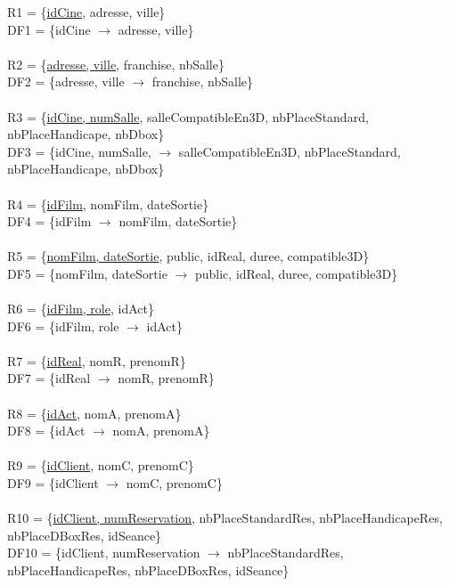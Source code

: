 \documentclass[a4paper,sffamily,12pt]{article}
\begin{document}
					\noindent R1 = \{\underline{idCine}, adresse, ville\} \\  DF1 = \{idCine $\rightarrow$ adresse, ville\} \\
					\\
					R2 = \{\underline{adresse, ville}, franchise, nbSalle\} \\ DF2 = \{adresse, ville $\rightarrow$ franchise, nbSalle\} \\
					\\
					R3 = \{\underline{idCine, numSalle}, salleCompatibleEn3D, nbPlaceStandard, nbPlaceHandicape, nbDbox\} \\ DF3 = \{idCine, numSalle, $\rightarrow$ salleCompatibleEn3D, nbPlaceStandard, nbPlaceHandicape, nbDbox\} \\
					\\
					R4 = \{\underline{idFilm}, nomFilm, dateSortie\} \\ DF4 = \{idFilm $\rightarrow$ nomFilm, dateSortie\} \\
					\\
					R5 = \{\underline{nomFilm, dateSortie}, public, idReal, duree, compatible3D\} \\ DF5 = \{nomFilm, dateSortie $\rightarrow$ public, idReal, duree, compatible3D\} \\	
					\\							
					R6 = \{\underline{idFilm, role}, idAct\} \\ DF6 = \{idFilm, role $\rightarrow$  idAct\} \\
					\\
					R7 = \{\underline{idReal}, nomR, prenomR\} \\ DF7 = \{idReal $\rightarrow$ nomR, prenomR\} \\
					\\
					R8 = \{\underline{idAct}, nomA, prenomA\} \\ DF8 = \{idAct $\rightarrow$ nomA, prenomA\} \\
					\\
					R9 = \{\underline{idClient}, nomC, prenomC\} \\ DF9 = \{idClient $\rightarrow$ nomC, prenomC\} \\ 
					\\
					R10 = \{\underline{idClient, numReservation}, nbPlaceStandardRes, nbPlaceHandicapeRes, nbPlaceDBoxRes, idSeance\} \\ DF10 = \{idClient, numReservation $\rightarrow$  nbPlaceStandardRes, nbPlaceHandicapeRes, nbPlaceDBoxRes, idSeance\} \\
					
\end{document}
